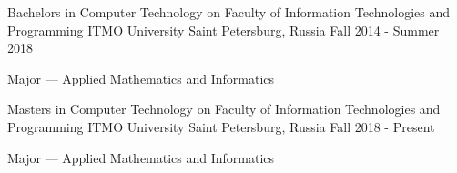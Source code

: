 

\begin{cventries}

    \cventry
    {Bachelor\textquotesingle s in Computer Technology on Faculty of Information Technologies and Programming} %
    {ITMO University} %
    {Saint Petersburg, Russia} %
    {Fall 2014 - Summer 2018} %
    {
    \begin{cvitems} %
        \item {Major --- Applied Mathematics and Informatics}
    \end{cvitems}
    }

    \cventry
    {Master\textquotesingle s in Computer Technology on Faculty of Information Technologies and Programming} %
    {ITMO University} %
    {Saint Petersburg, Russia} %
    {Fall 2018 - Present} %
    {
    \begin{cvitems} %
        \item {Major --- Applied Mathematics and Informatics}
    \end{cvitems}
    }

\end{cventries}
